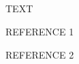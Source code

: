 \documentclass[journal abbreviation, manuscript]{copernicus}
\begin{document}
\subsection{}     %


\noappendix       %




\appendixfigures  %

\appendixtables   %







\begin{acknowledgements}
 TEXT
\end{acknowledgements}






\begin{thebibliography}{}

 REFERENCE 1

 REFERENCE 2

\end{thebibliography}
\end{document}
